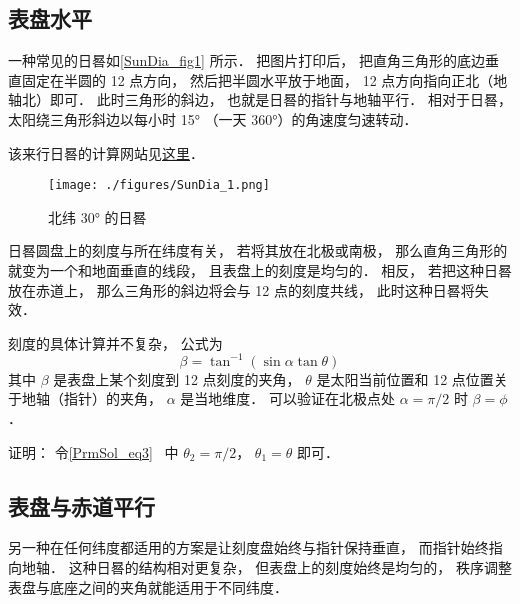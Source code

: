 
\begin{issues}
\issueDraft
\end{issues}

\subsection{表盘水平}
一种常见的日晷如\autoref{SunDia_fig1} 所示． 把图片打印后， 把直角三角形的底边垂直固定在半圆的 12 点方向， 然后把半圆水平放于地面， 12 点方向指向正北（地轴北）即可． 此时三角形的斜边， 也就是日晷的指针与地轴平行． 相对于日晷， 太阳绕三角形斜边以每小时 15° （一天 360°）的角速度匀速转动．

该来行日晷的计算网站见\href{https://www.blocklayer.com/sundial.aspx}{这里}．
\begin{figure}[ht]
\centering
\texttt{[image: ./figures/SunDia\_1.png]}
\caption{北纬 30° 的日晷} \label{SunDia_fig1}
\end{figure}

日晷圆盘上的刻度与所在纬度有关， 若将其放在北极或南极， 那么直角三角形的就变为一个和地面垂直的线段， 且表盘上的刻度是均匀的． 相反， 若把这种日晷放在赤道上， 那么三角形的斜边将会与 12 点的刻度共线， 此时这种日晷将失效．

刻度的具体计算并不复杂， 公式为
\begin{equation}
\beta = \tan^{-1}(\sin\alpha \tan \theta)
\end{equation}
其中 $\beta$ 是表盘上某个刻度到 12 点刻度的夹角， $\theta$ 是太阳当前位置和 12 点位置关于地轴（指针）的夹角， $\alpha$ 是当地维度． 可以验证在北极点处 $\alpha = \pi/2$ 时 $\beta = \phi$．

证明： 令\autoref{PrmSol_eq3}~ 中 $\theta_2 = \pi/2$， $\theta_1 = \theta$ 即可．

\subsection{表盘与赤道平行}
另一种在任何纬度都适用的方案是让刻度盘始终与指针保持垂直， 而指针始终指向地轴． 这种日晷的结构相对更复杂， 但表盘上的刻度始终是均匀的， 秩序调整表盘与底座之间的夹角就能适用于不同纬度．
